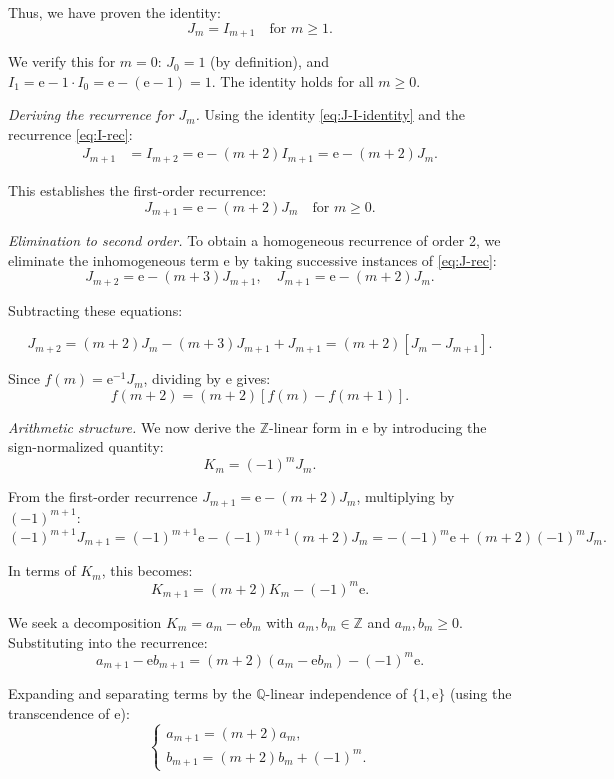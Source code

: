 \documentclass[11pt,reqno]{amsart}
\theoremstyle{definition}
\newcommand{\Z}{\mathbb{Z}}
\newcommand{\Q}{\mathbb{Q}}
\newcommand{\ee}{\mathrm{e}}
\numberwithin{equation}{section}
\begin{document}
Thus, we have proven the identity:
\begin{equation}\label{eq:J-I-identity}
J_m = I_{m+1} \quad \text{for } m \geq 1.
\end{equation}

We verify this for $m=0$: $J_0=1$ (by definition), and $I_1 = \ee - 1\cdot I_0 = \ee - (\ee-1) = 1$. The identity holds for all $m \geq 0$.

\textit{Deriving the recurrence for $J_m$.} Using the identity \eqref{eq:J-I-identity} and the recurrence \eqref{eq:I-rec}:
\begin{align*}
J_{m+1} &= I_{m+2} = \ee - (m+2)I_{m+1} = \ee - (m+2)J_m.
\end{align*}

This establishes the first-order recurrence:
\begin{equation}\label{eq:J-rec}
J_{m+1} = \ee - (m+2)J_m \quad \text{for } m \geq 0.
\end{equation}

\textit{Elimination to second order.} To obtain a homogeneous recurrence of order 2, we eliminate the inhomogeneous term $\ee$ by taking successive instances of \eqref{eq:J-rec}:
$$J_{m+2} = \ee - (m+3)J_{m+1}, \quad J_{m+1} = \ee - (m+2)J_m.$$

Subtracting these equations:

$$J_{m+2} = (m+2)J_m - (m+3)J_{m+1} + J_{m+1} = (m+2)[J_m - J_{m+1}].$$

Since $f(m) = \ee^{-1}J_m$, dividing by $\ee$ gives:
\begin{equation}\label{eq:f-discrete}
f(m+2) = (m+2)[f(m) - f(m+1)].
\end{equation}

\textit{Arithmetic structure.} We now derive the $\Z$-linear form in $\ee$ by introducing the sign-normalized quantity:
$$K_m = (-1)^m J_m.$$

From the first-order recurrence $J_{m+1} = \ee - (m+2)J_m$, multiplying by $(-1)^{m+1}$:
$$(-1)^{m+1}J_{m+1} = (-1)^{m+1}\ee - (-1)^{m+1}(m+2)J_m = -(-1)^m\ee + (m+2)(-1)^mJ_m.$$

In terms of $K_m$, this becomes:
$$K_{m+1} = (m+2)K_m - (-1)^m \ee.$$

We seek a decomposition $K_m = a_m - \ee b_m$ with $a_m, b_m \in \Z$ and $a_m, b_m \ge 0$. Substituting into the recurrence:
$$a_{m+1} - \ee b_{m+1} = (m+2)(a_m - \ee b_m) - (-1)^m \ee.$$

Expanding and separating terms by the $\Q$-linear independence of $\{1, \ee\}$ (using the transcendence of $\ee$):
$$\begin{cases}
a_{m+1} = (m+2)a_m, \\
b_{m+1} = (m+2)b_m + (-1)^m.
\end{cases}$$
\end{document}

